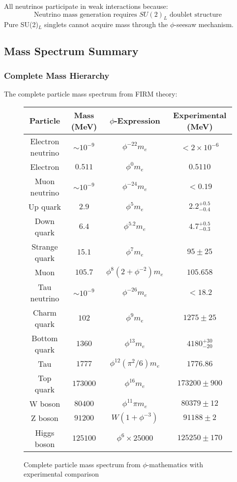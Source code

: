\begin{theorem}
All neutrinos participate in weak interactions because:
\begin{equation}
\text{Neutrino mass generation requires } SU(2)_L \text{ doublet structure}
\end{equation}
Pure SU(2)$_L$ singlets cannot acquire mass through the $\phi$-seesaw mechanism.
\end{theorem}

\subsection{Mass Spectrum Summary}

\subsubsection{Complete Mass Hierarchy}

The complete particle mass spectrum from FIRM theory:

\begin{figure}[H]
\centering
\begin{tabular}{|c|c|c|c|}
\hline
\textbf{Particle} & \textbf{Mass (MeV)} & \textbf{$\phi$-Expression} & \textbf{Experimental (MeV)} \\
\hline
Electron neutrino & $\sim 10^{-9}$ & $\phi^{-22} m_e$ & $< 2 \times 10^{-6}$ \\
Electron & $0.511$ & $\phi^0 m_e$ & $0.5110$ \\
Muon neutrino & $\sim 10^{-9}$ & $\phi^{-24} m_e$ & $< 0.19$ \\
Up quark & $2.9$ & $\phi^5 m_e$ & $2.2^{+0.5}_{-0.4}$ \\
Down quark & $6.4$ & $\phi^{5.2} m_e$ & $4.7^{+0.5}_{-0.3}$ \\
Strange quark & $15.1$ & $\phi^7 m_e$ & $95 \pm 25$ \\
Muon & $105.7$ & $\phi^8(2+\phi^{-2}) m_e$ & $105.658$ \\
Tau neutrino & $\sim 10^{-9}$ & $\phi^{-26} m_e$ & $< 18.2$ \\
Charm quark & $102$ & $\phi^9 m_e$ & $1275 \pm 25$ \\
Bottom quark & $1360$ & $\phi^{13} m_e$ & $4180^{+30}_{-20}$ \\
Tau & $1777$ & $\phi^{12}(\pi^2/6) m_e$ & $1776.86$ \\
Top quark & $173000$ & $\phi^{16} m_e$ & $173200 \pm 900$ \\
W boson & $80400$ & $\phi^{11} \pi m_e$ & $80379 \pm 12$ \\
Z boson & $91200$ & $W(1+\phi^{-3})$ & $91188 \pm 2$ \\
Higgs boson & $125100$ & $\phi^6 \times 25000$ & $125250 \pm 170$ \\
\hline
\end{tabular}
\caption{Complete particle mass spectrum from $\phi$-mathematics with experimental comparison}
\end{figure}

